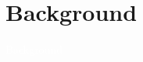 \documentclass[xcolor=dvipsnames]{beamer}
\begin{document}
\section{Background}

{
\begin{frame}
    \centering
    \textcolor{white}{\LARGE Background}
\end{frame}
}


















\end{document}
